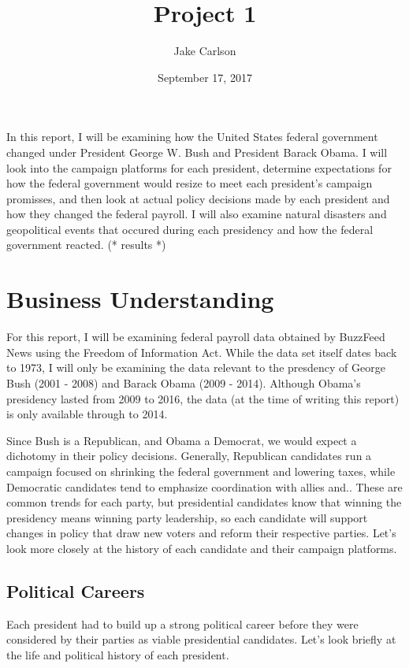 \documentclass{article}
\begin{document}
\title{Project 1}
\author{Jake Carlson}
\date{September 17, 2017}
\maketitle

\abstract
In this report, I will be examining how the United States federal government changed under President George W. Bush and President Barack Obama. I will look into the campaign platforms for each president, determine expectations for how the federal government would resize to meet each president's campaign promisses, and then look at actual policy decisions made by each president and how they changed the federal payroll. I will also examine natural disasters and geopolitical events that occured during each presidency and how the federal government reacted. (* results *)
\newpage

\tableofcontents
\newpage

\section{Business Understanding}
For this report, I will be examining federal payroll data obtained by BuzzFeed News using the Freedom of Information Act. While the data set itself dates back to 1973, I will only be examining the data relevant to the presdency of George Bush (2001 - 2008) and Barack Obama (2009 - 2014). Although Obama's presidency lasted from 2009 to 2016, the data (at the time of writing this report) is only available through to 2014.
\par
Since Bush is a Republican, and Obama a Democrat, we would expect a dichotomy in their policy decisions. Generally, Republican candidates run a campaign focused on shrinking the federal government and lowering taxes, while Democratic candidates tend to emphasize coordination with allies and.. These are common trends for each party, but presidential candidates know that winning the presidency means winning party leadership, so each candidate will support changes in policy that draw new voters and reform their respective parties. Let's look more closely at the history of each candidate and their campaign platforms.

    \subsection{Political Careers}
    Each president had to build up a strong political career before they were considered by their parties as viable presidential candidates. Let's look briefly at the life and political history of each president.
\end{document}

